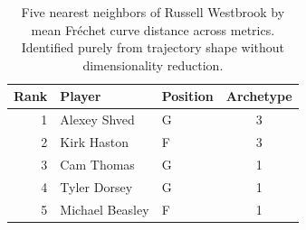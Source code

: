 \begin{table}[htbp]
  \centering\small
  \begin{tabular}{rllc}
    \toprule
    Rank & Player & Position & Archetype \\
    \midrule
    1 & Alexey Shved & G & 3 \\
    2 & Kirk Haston & F & 3 \\
    3 & Cam Thomas & G & 1 \\
    4 & Tyler Dorsey & G & 1 \\
    5 & Michael Beasley & F & 1 \\
    \bottomrule
  \end{tabular}
  \caption{Five nearest neighbors of Russell Westbrook by mean Fr\'{e}chet curve distance across metrics. Identified purely from trajectory shape without dimensionality reduction.}
  \label{tab:Russell_Westbrook_frechet_curve_neighbors}
\end{table}

